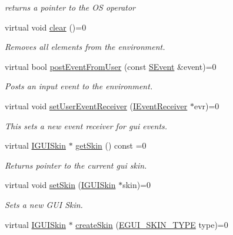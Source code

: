 \begin{DoxyCompactItemize}
\begin{DoxyCompactList}\small\item\em returns a pointer to the OS operator \end{DoxyCompactList}\item 
\mbox{\label{classirr_1_1gui_1_1IGUIEnvironment_a77b0cdd0aec36dbb9c558446fab383c2}} 
virtual void \hyperlink{classirr_1_1gui_1_1IGUIEnvironment_a77b0cdd0aec36dbb9c558446fab383c2}{clear} ()=0
\begin{DoxyCompactList}\small\item\em Removes all elements from the environment. \end{DoxyCompactList}\item 
virtual bool \hyperlink{classirr_1_1gui_1_1IGUIEnvironment_aff1cc1109841f9bccd19634870c7cd65}{post\+Event\+From\+User} (const \hyperlink{structirr_1_1SEvent}{S\+Event} \&event)=0
\begin{DoxyCompactList}\small\item\em Posts an input event to the environment. \end{DoxyCompactList}\item 
virtual void \hyperlink{classirr_1_1gui_1_1IGUIEnvironment_a2491715aa30894c66357eb0451aa10b0}{set\+User\+Event\+Receiver} (\hyperlink{classirr_1_1IEventReceiver}{I\+Event\+Receiver} $\ast$evr)=0
\begin{DoxyCompactList}\small\item\em This sets a new event receiver for gui events. \end{DoxyCompactList}\item 
virtual \hyperlink{classirr_1_1gui_1_1IGUISkin}{I\+G\+U\+I\+Skin} $\ast$ \hyperlink{classirr_1_1gui_1_1IGUIEnvironment_a54ce9072ea7b89cdaea65306e93ba90c}{get\+Skin} () const =0
\begin{DoxyCompactList}\small\item\em Returns pointer to the current gui skin. \end{DoxyCompactList}\item 
virtual void \hyperlink{classirr_1_1gui_1_1IGUIEnvironment_ae7042c520e848643e080ad4532797f23}{set\+Skin} (\hyperlink{classirr_1_1gui_1_1IGUISkin}{I\+G\+U\+I\+Skin} $\ast$skin)=0
\begin{DoxyCompactList}\small\item\em Sets a new G\+UI Skin. \end{DoxyCompactList}\item 
virtual \hyperlink{classirr_1_1gui_1_1IGUISkin}{I\+G\+U\+I\+Skin} $\ast$ \hyperlink{classirr_1_1gui_1_1IGUIEnvironment_a824099cd1ba9dd4b95e40dd1b15244f1}{create\+Skin} (\hyperlink{namespaceirr_1_1gui_a7b4619db540cbdf96e81023893b4eca5}{E\+G\+U\+I\+\_\+\+S\+K\+I\+N\+\_\+\+T\+Y\+PE} type)=0

\end{DoxyCompactItemize}
